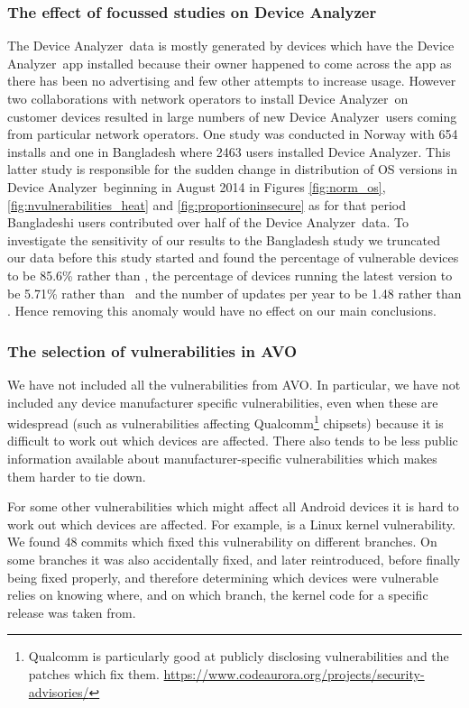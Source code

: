\documentclass{llncs}
\makeatletter
\newcommand{\da}{Device Analyzer}
\newcommand{\avo}{AVO}
\def\avovuln{\@ifnextchar[{\@avovulnsspecific}{\@avovulngeneral}}
\def\@avovulnsspecific[#1]#2{\emph{\href{http://androidvulnerabilities.org/vulnerabilities/#1}{#2}}}
\def\@avovulngeneral#1{\emph{\href{http://androidvulnerabilities.org/vulnerabilities/#1}{#1}}}
\makeatother
\begin{document}
\subsubsection{The effect of focussed studies on \da}
\label{sec:da_changes}
The \da\ data is mostly generated by devices which have the \da\ app installed because their owner happened to come across the app as there has been no advertising and few other attempts to increase usage.
However two collaborations with network operators to install \da\ on customer devices resulted in large numbers of new \da\ users coming from particular network operators.
One study was conducted in Norway with 654 installs and one in Bangladesh where 2463 users installed \da.
This latter study is responsible for the sudden change in distribution of OS versions in \da\ beginning in August 2014 in Figures \ref{fig:norm_os}, \ref{fig:nvulnerabilities_heat} and \ref{fig:proportioninsecure} as for that period Bangladeshi users contributed over half of the \da\ data.
To investigate the sensitivity of our results to the Bangladesh study we truncated our data before this study started and found the percentage of vulnerable devices to be 85.6\% rather than \daMeanInsecurityPercNominal, the percentage of devices running the latest version to be 5.71\% rather than \daUpdatednessPercNominal\ and the number of updates per year to be 1.48 rather than \daUpdatesPerYearNominal.
Hence removing this anomaly would have no effect on our main conclusions.

\subsubsection{The selection of vulnerabilities in \avo}
We have not included all the vulnerabilities from \avo. 
In particular, we have not included any device manufacturer specific vulnerabilities, even when these are widespread (such as vulnerabilities affecting Qualcomm\footnote{Qualcomm is particularly good at publicly disclosing vulnerabilities and the patches which fix them. \url{https://www.codeaurora.org/projects/security-advisories/}} chipsets) because it is difficult to work out which devices are affected.
There also tends to be less public information available about manufacturer-specific vulnerabilities which makes them harder to tie down.

For some other vulnerabilities which might affect all Android devices it is hard to work out which devices are affected.
For example, \avovuln[pty_race]{pty race} is a Linux kernel vulnerability. We found 48 commits which fixed this vulnerability on different branches. On some branches it was also accidentally fixed, and later reintroduced, before finally being fixed properly, and therefore determining which devices were vulnerable relies on knowing where, and on which branch, the kernel code for a specific release was taken from.
\end{document}
